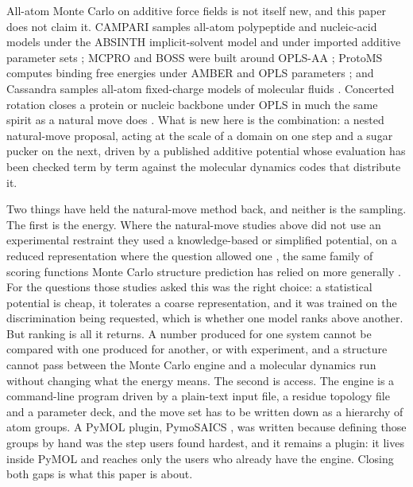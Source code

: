 All-atom Monte Carlo on additive force fields is not itself new, and this paper
does not claim it. CAMPARI samples all-atom polypeptide and nucleic-acid models
under the ABSINTH implicit-solvent model and under imported additive parameter
sets \cite{vitalis2009mcmethods}; MCPRO and BOSS were built around OPLS-AA
\cite{jorgensen2005mcpro}; ProtoMS computes binding free energies under AMBER
and OPLS parameters \cite{protoms-software}; and Cassandra samples all-atom
fixed-charge models of molecular fluids \cite{shah2017cassandra}. Concerted
rotation closes a protein or nucleic backbone under OPLS in much the same spirit
as a natural move does
\cite{ulmschneider2003concerted,ulmschneider2004concertedna}. What is new here
is the combination: a nested natural-move proposal, acting at the scale of a
domain on one step and a sugar pucker on the next, driven by a published
additive potential whose evaluation has been checked term by term against the
molecular dynamics codes that distribute it.

Two things have held the natural-move method back, and neither is the sampling.
The first is the energy. Where the natural-move studies above did not use an
experimental restraint they used a knowledge-based or simplified potential, on a
reduced representation where the question allowed one \cite{minary2008foldspace},
the same family of scoring functions Monte Carlo structure prediction has relied
on more generally \cite{leaverfay2011rosetta}. For the questions those studies
asked this was the right choice: a statistical potential is cheap, it tolerates
a coarse representation, and it was trained on the discrimination being
requested, which is whether one model ranks above another. But ranking is all it
returns. A number produced for one system cannot be compared with one produced
for another, or with experiment, and a structure cannot pass between the Monte
Carlo engine and a molecular dynamics run without changing what the energy
means. The second is access. The engine is a command-line program driven by a
plain-text input file, a residue topology file and a parameter deck, and the
move set has to be written down as a hierarchy of atom groups. A PyMOL plugin,
PymoSAICS \cite{pymosaics-plugin}, was written because defining those groups by
hand was the step users found hardest, and it remains a plugin: it lives inside
PyMOL and reaches only the users who already have the engine. Closing both gaps is what this paper
is about.

